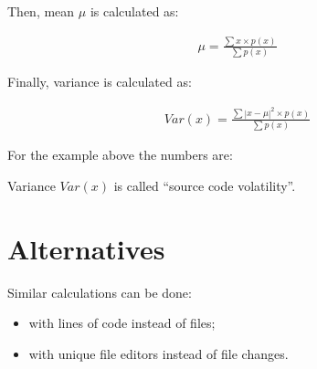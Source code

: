 \documentclass[12pt]{article}
\begin{document}
    \begin{figure}[ht]
    \centering
    \immediate{}
    
    \end{figure}

    Then, mean $\mu$ is calculated as:

    \begin{eqnarray}
    \mu = \frac{\displaystyle\sum {x \times p(x)}}{\displaystyle\sum p(x)}
    \end{eqnarray}

    Finally, variance is calculated as:

    \begin{eqnarray}
    Var(x) = \frac{\displaystyle\sum {|x - \mu|^2 \times p(x)}}{\displaystyle\sum p(x)}
    \end{eqnarray}

    For the example above the numbers are:

    \begin{figure}[ht]
    \centering
    \immediate{}
    
    \end{figure}

    Variance $Var(x)$ is called ``source code volatility''.

\section{Alternatives}

    Similar calculations can be done:

    \begin{itemize}
        \item with lines of code instead of files;
        \item with unique file editors instead of file changes.
    \end{itemize}
\end{document}
